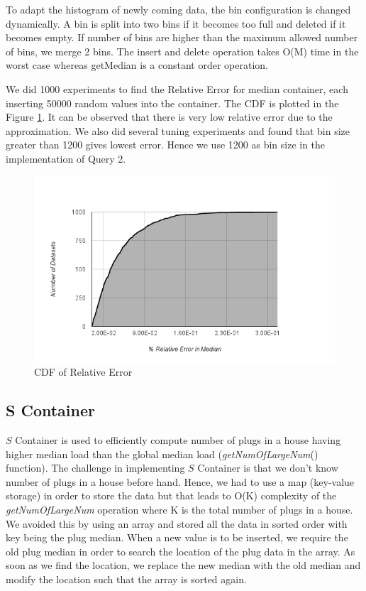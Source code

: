 To adapt the histogram of newly coming data, the bin configuration is changed dynamically. A bin is split into two bins if it becomes too full and deleted if it becomes empty. If number of bins are higher than the maximum allowed number of bins, we merge 2 bins. The insert and delete operation takes O(M) time in the worst case whereas getMedian is a constant order operation.

We did 1000 experiments to find the Relative Error for median container, each inserting 50000 random values into the container. The CDF is plotted in the Figure \ref{fig:relative_error}. It can be observed that there is very low relative error due to the approximation. We also did several tuning experiments and found that bin size greater than 1200 gives lowest error. Hence we use 1200 as bin size in the implementation of Query 2.

\begin{figure}[h]
\begin{center}
\includegraphics[scale=0.5]{img/relative_error}
\vspace*{-0.3cm}
\caption{CDF of Relative Error \label{fig:relative_error}}
\end{center}
\vspace*{-0.7cm}
\end{figure}

\subsection{S Container}
$S$ Container is used to efficiently compute number of plugs in a house having higher median load than the global median load (\textit{getNumOfLargeNum}() function). The challenge in implementing $S$ Container is that we don't know number of plugs in a house before hand. Hence, we had to use a map (key-value storage) in order to store the data but that leads to O(K) complexity of the \textit{getNumOfLargeNum} operation where K is the total number of plugs in a house. We avoided this by using an array and stored all the data in sorted order with key being the plug median. When a new value is to be inserted, we require the old plug median in order to search the location of the plug data in the array. As soon as we find the location, we replace the new median with the old median and modify the location such that the array is sorted again.

